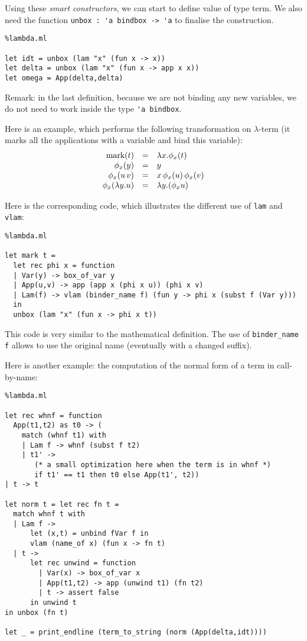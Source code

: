 \documentclass[11pt]{article}
\begin{document}
Using these \emph{smart constructors}, we can start to define value of
type term. We also need the function \verb#unbox : 'a bindbox -> 'a#
to finalise the construction.
\begin{lstlisting}%lambda.ml

let idt = unbox (lam "x" (fun x -> x))
let delta = unbox (lam "x" (fun x -> app x x))
let omega = App(delta,delta)
\end{lstlisting}

Remark: in the last definition, because we are not binding any new
variables, we do not need to work inside the type \verb#'a bindbox#.

Here is an example, which performs the following transformation on
$\lambda$-term (it marks all the applications with a variable and bind this variable):
$$
\begin{array}{rcl}
\hbox{mark}(t) &=& \lambda x.\phi_x(t) \cr
\phi_x(y) &=& y \cr
\phi_x(u\,v) &=& x\,\phi_x(u)\,\phi_x(v) \cr
\phi_x(\lambda y.u) &=& \lambda y.(\phi_x u)
\end{array}
$$

Here is the corresponding code, which illustrates the different use
of \verb#lam# and \verb#vlam#:

\begin{lstlisting}%lambda.ml

let mark t =
  let rec phi x = function
  | Var(y) -> box_of_var y
  | App(u,v) -> app (app x (phi x u)) (phi x v)
  | Lam(f) -> vlam (binder_name f) (fun y -> phi x (subst f (Var y)))
  in
  unbox (lam "x" (fun x -> phi x t))
\end{lstlisting}

This code is very similar to the mathematical definition.
The use of \verb#binder_name f# allows to use the original name
(eventually with a changed suffix).

Here is another example: the computation of the normal form of a term
in call-by-name:

\begin{lstlisting}%lambda.ml

let rec whnf = function
  App(t1,t2) as t0 -> (
    match (whnf t1) with
    | Lam f -> whnf (subst f t2)
    | t1' ->
       (* a small optimization here when the term is in whnf *)
       if t1' == t1 then t0 else App(t1', t2))
| t -> t

let norm t = let rec fn t =
  match whnf t with
  | Lam f ->
      let (x,t) = unbind fVar f in
      vlam (name_of x) (fun x -> fn t)
  | t ->
      let rec unwind = function
        | Var(x) -> box_of_var x
        | App(t1,t2) -> app (unwind t1) (fn t2)
        | t -> assert false
      in unwind t
in unbox (fn t)

let _ = print_endline (term_to_string (norm (App(delta,idt))))
\end{lstlisting}
\end{document}
